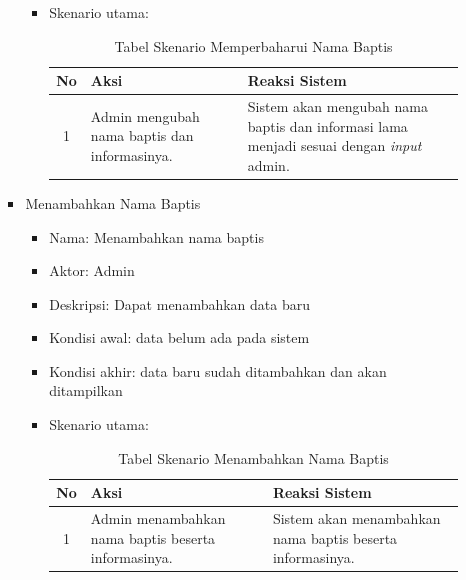 \begin{enumerate}
\begin{enumerate}
\begin{itemize}
\begin{itemize}
																				
																				\item Skenario utama:														
			\begin{table}[H]
	\centering
	\caption{Tabel Skenario Memperbaharui Nama Baptis}
		\begin{tabular}{ | c | p{5cm} |p{5cm} |} \hline
     No  & Aksi & Reaksi Sistem\\ \hline 
				1 & Admin mengubah nama baptis dan informasinya.%
				&  Sistem akan mengubah nama baptis dan informasi lama menjadi sesuai dengan \textit{input} admin.\\ \hline
		
						\end{tabular}
	\label{table:skenario4}
\end{table}
			
			

                                \end{itemize}
		\item Menambahkan Nama Baptis

                                \begin{itemize}
                                        \item Nama: Menambahkan nama baptis
                                        \item Aktor: Admin
                                        \item Deskripsi: Dapat menambahkan data baru
                                        \item Kondisi awal: data belum ada pada sistem %
                                        \item Kondisi akhir: data baru sudah ditambahkan dan akan ditampilkan%
                                        \item Skenario utama:														
				
				
				\begin{table}[H]
	\centering
	\caption{Tabel Skenario Menambahkan Nama Baptis}
		\begin{tabular}{ | c | p{5cm} |p{5cm} |} \hline
     No  & Aksi & Reaksi Sistem\\ \hline 
				1 & Admin menambahkan nama baptis beserta informasinya.%
				&  Sistem akan menambahkan nama baptis beserta informasinya.\\ \hline
		

\end{tabular}
\end{table}
\end{itemize}
\end{itemize}
\end{enumerate}
\end{enumerate}
